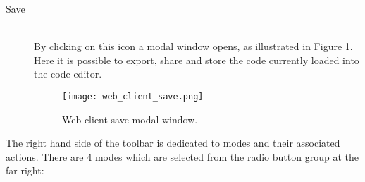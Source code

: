 \begin{description}
  \item[ Save]~\\
    By clicking on this icon a modal window opens, as illustrated in Figure \ref{fig:web_client_save}. Here it is possible to export, share and store the code currently loaded into the code editor.\\
    \begin{figure}[H]
      \texttt{[image: web\_client\_save.png]}
      \caption{Web client save modal window.}
      \label{fig:web_client_save}
    \end{figure}

\end{description}

\noindent
The right hand side of the toolbar is dedicated to modes and their associated actions. There are 4 modes which are selected from the radio button group at the far right:\\

